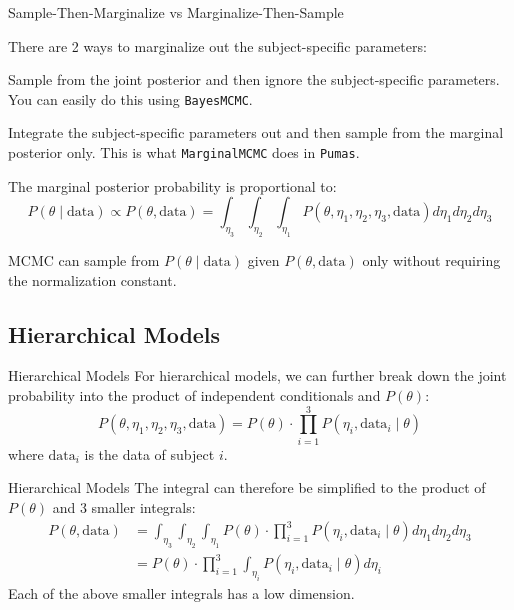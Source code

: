 \begin{frame}{Sample-Then-Marginalize vs Marginalize-Then-Sample}
	\begin{vfilleditems}
		\item There are 2 ways to marginalize out the subject-specific parameters:
		\begin{vfilleditems}
			\item Sample from the joint posterior and then ignore the subject-specific parameters. You can easily do this using \lstinline{BayesMCMC}.
			\item Integrate the subject-specific parameters out and then sample from the marginal posterior only. This is what \lstinline{MarginalMCMC} does in \lstinline{Pumas}.
		\end{vfilleditems}
		\item The marginal posterior probability is proportional to:
		$$
			P(\theta \mid \text{data}) \propto P(\theta, \text{data}) = \int_{\eta_3} \int_{\eta_2} \int_{\eta_1} P(\theta, \eta_1, \eta_2, \eta_3, \text{data}) d\eta_1 d\eta_2 d\eta_3
		$$
		\item MCMC can sample from $P(\theta \mid \text{data})$ given $P(\theta, \text{data})$ only without requiring the normalization constant.
	\end{vfilleditems}
\end{frame}

\subsection{Hierarchical Models}
\begin{frame}{Hierarchical Models}
	For hierarchical models, we can further break down the joint probability into the product of independent conditionals and $P(\theta)$:
	$$
		P(\theta, \eta_1, \eta_2, \eta_3, \text{data}) = P(\theta) \cdot \prod_{i=1}^3 P(\eta_i, \text{data}_i \mid \theta)
	$$
	where $\text{data}_i$ is the data of subject $i$.
\end{frame}

\begin{frame}{Hierarchical Models}
	The integral can therefore be simplified to the product of $P(\theta)$ and 3 smaller integrals:
	$$
		\begin{aligned}
			P(\theta, \text{data}) & = \int_{\eta_3} \int_{\eta_2} \int_{\eta_1} P(\theta) \cdot \prod_{i=1}^3 P(\eta_i, \text{data}_i \mid \theta) d\eta_1 d\eta_2 d\eta_3 \\
			                       & = P(\theta) \cdot \prod_{i=1}^3 \int_{\eta_i} P(\eta_i, \text{data}_i \mid \theta) d\eta_i
		\end{aligned}
	$$
	\vfill
	Each of the above smaller integrals has a low dimension.
\end{frame}

